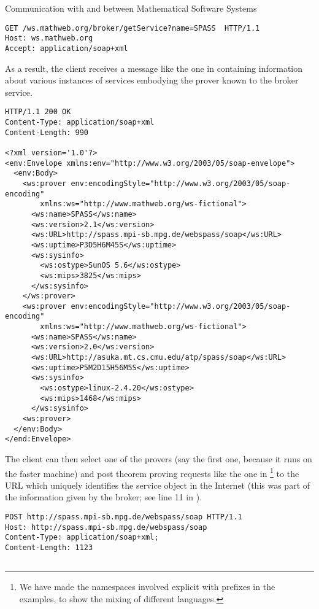 \begin{tchapter}[id=rpc,short=Communication between Systems]{Communication with and between Mathematical Software Systems}
\begin{lstlisting}[label=lst:discover-spass,
          caption={Discovering Automated Theorem Provers (Request)}]
GET /ws.mathweb.org/broker/getService?name=SPASS  HTTP/1.1
Host: ws.mathweb.org
Accept: application/soap+xml
\end{lstlisting}

As a result, the client receives a {\soap} message like the one in
{} containing information about various instances of
services embodying the {\spass} prover known to the broker service.

\begin{lstlisting}[label=lst:rpc-spass,
          caption={Discovering Automated Theorem Provers (Response)}]
HTTP/1.1 200 OK
Content-Type: application/soap+xml
Content-Length: 990

<?xml version='1.0'?>
<env:Envelope xmlns:env="http://www.w3.org/2003/05/soap-envelope">
  <env:Body>
    <ws:prover env:encodingStyle="http://www.w3.org/2003/05/soap-encoding"
        xmlns:ws="http://www.mathweb.org/ws-fictional">
      <ws:name>SPASS</ws:name>
      <ws:version>2.1</ws:version>
      <ws:URL>http://spass.mpi-sb.mpg.de/webspass/soap</ws:URL>
      <ws:uptime>P3D5H6M45S</ws:uptime>
      <ws:sysinfo>
        <ws:ostype>SunOS 5.6</ws:ostype>
        <ws:mips>3825</ws:mips>
      </ws:sysinfo>
    </ws:prover>
    <ws:prover env:encodingStyle="http://www.w3.org/2003/05/soap-encoding"
        xmlns:ws="http://www.mathweb.org/ws-fictional">
      <ws:name>SPASS</ws:name>
      <ws:version>2.0</ws:version>
      <ws:URL>http://asuka.mt.cs.cmu.edu/atp/spass/soap</ws:URL>
      <ws:uptime>P5M2D15H56M5S</ws:uptime>
      <ws:sysinfo>
        <ws:ostype>linux-2.4.20</ws:ostype>
        <ws:mips>1468</ws:mips>
      </ws:sysinfo>
    <ws:prover>
  </env:Body>
</end:Envelope>
\end{lstlisting}

The client can then select one of the provers (say the first one, because it runs
on the faster machine) and post theorem proving requests like the one in
{}\footnote{We have made the namespaces involved explicit
  with prefixes in the examples, to show the mixing of different {\xml}
  languages.} to the URL which uniquely identifies the service object in the
Internet (this was part of the information given by the broker; see line 11 in
{}).

\begin{lstlisting}[label=lst:rpc-prover,
  caption={A {\soap} RPC call to {\spass}}]
POST http://spass.mpi-sb.mpg.de/webspass/soap HTTP/1.1
Host: http://spass.mpi-sb.mpg.de/webspass/soap
Content-Type: application/soap+xml; 
Content-Length: 1123


\end{lstlisting}
\end{tchapter}
